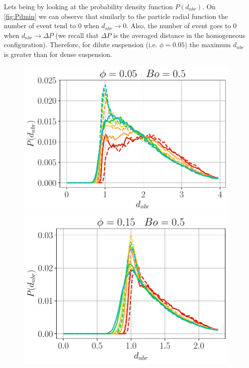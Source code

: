 Lets being by looking at the probability density function $P(d_{nbr})$.
On \ref{fig:Pdmin} we can observe that similarly to the particle radial function the number of event tend to $0$ when $d_{nbr} \rightarrow 0$.
Also, the number of event goes to $0$ when $d_{nbr} \rightarrow \Delta P$
(we recall that $\Delta P$ is the averaged distance in the homogeneous configuration).
Therefore, for dilute suspension (i.e. $\phi =0.05$) the maximum $d_{nbr}$ is greater than for dense suspension. 
\begin{figure}[h!]
    \centering
    \includegraphics[height=0.15\textheight]{image/N_10/Pcond/probaNBo0_5PHI0_05.pdf}
    \includegraphics[height=0.15\textheight]{image/N_10/Pcond/probaNBo0_5PHI0_15.pdf}

\end{figure}
